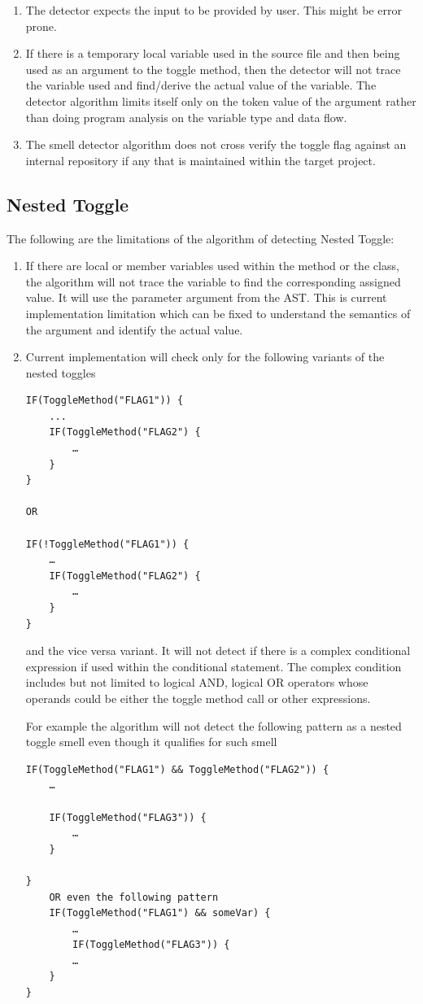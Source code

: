 \documentclass[conference]{IEEEtran}
\begin{document}
\begin{enumerate}
\item{The detector expects the input to be provided by user. This might be error prone.}
	
\item{If there is a temporary local variable used in the source file and then being used as an argument to the toggle method, then the detector will not trace the variable used and find/derive the actual value of the variable. The detector algorithm limits itself only on the token value of the argument rather than doing program analysis on the variable type and data flow.}
	
\item{The smell detector algorithm does not cross verify the toggle flag against an internal repository if any that is maintained within the target project.}
\end{enumerate}

\subsection{Nested Toggle}
The following are the limitations of the algorithm of detecting Nested Toggle:
\begin{enumerate}
\item{If there are local or member variables used within the method or the class, the algorithm will not trace the variable to find the corresponding assigned value. It will use the parameter argument from the AST. This is current implementation limitation which can be fixed to understand the semantics of the argument and identify the actual value.}
\item{Current implementation will check only for the following variants of the nested toggles

\begin{lstlisting}
IF(ToggleMethod("FLAG1")) {
	...
	IF(ToggleMethod("FLAG2") {
		…
	}
}

OR

IF(!ToggleMethod("FLAG1")) {
	…
	IF(ToggleMethod("FLAG2") {
		…
	}
}\end{lstlisting}

and the vice versa variant. It will not detect if there is a complex conditional expression if used within the conditional statement. The complex condition includes but not limited to logical AND, logical OR operators whose operands could be either the toggle method call or other expressions. 

For example the algorithm will not detect the following pattern as a nested toggle smell even though it qualifies for such smell
\begin{lstlisting}
IF(ToggleMethod("FLAG1") && ToggleMethod("FLAG2")) {
	…

	IF(ToggleMethod("FLAG3")) {
		…
	}

}	
	OR even the following pattern
	IF(ToggleMethod("FLAG1") && someVar) {
		…
		IF(ToggleMethod("FLAG3")) {
		…
	}
}
\end{lstlisting}
}
\end{enumerate}
\end{document}
